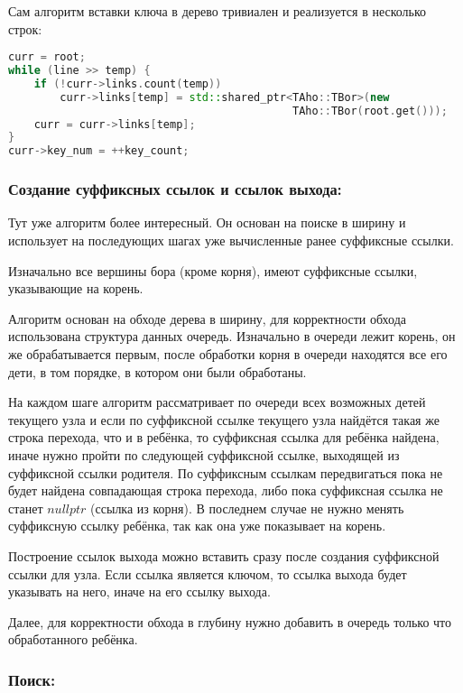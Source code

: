 \documentclass[12pt]{article}
\begin{document}
Сам алгоритм вставки ключа в дерево тривиален и реализуется в несколько строк:
{\small
\begin{lstlisting}[language=c++]
curr = root;
while (line >> temp) {
    if (!curr->links.count(temp))
        curr->links[temp] = std::shared_ptr<TAho::TBor>(new 
                                            TAho::TBor(root.get()));
    curr = curr->links[temp];
}
curr->key_num = ++key_count;
\end{lstlisting}}

\subsubsection*{Создание суффиксных ссылок и ссылок выхода:}

Тут уже алгоритм более интересный. Он основан на поиске в ширину и использует на последующих шагах уже вычисленные ранее суффиксные ссылки. 

Изначально все вершины бора (кроме корня), имеют суффиксные ссылки, указывающие на корень.

Алгоритм основан на обходе дерева в ширину, для корректности обхода использована структура данных очередь. Изначально в очереди лежит корень, он же обрабатывается первым, после обработки корня в очереди находятся все его дети, в том порядке, в котором они были обработаны.

На каждом шаге алгоритм рассматривает по очереди всех возможных детей текущего узла и если по суффиксной ссылке текущего узла найдётся такая же строка перехода, что и в ребёнка, то суффиксная ссылка для ребёнка найдена, иначе нужно пройти по следующей суффиксной ссылке, выходящей из суффиксной ссылки родителя. По суффиксным ссылкам передвигаться пока не будет найдена совпадающая строка перехода, либо пока суффиксная ссылка не станет $nullptr$ (ссылка из корня). В последнем случае не нужно менять суффиксную ссылку ребёнка, так как она уже показывает на корень. 

Построение ссылок выхода можно вставить сразу после создания суффиксной ссылки для узла. Если ссылка является ключом, то ссылка выхода будет указывать на него, иначе на его ссылку выхода.

Далее, для корректности обхода в глубину нужно добавить в очередь только что обработанного ребёнка.

\subsubsection*{Поиск:}
\end{document}
